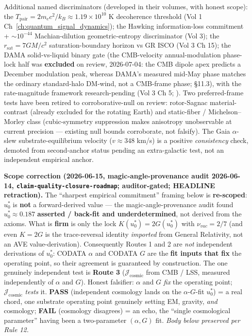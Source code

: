 \noindent Additional named discriminators (developed in their volumes, with honest scope): the $T_{\text{pair}} = 2m_ec^2/k_B \approx 1.19\times10^{10}$ K decoherence threshold (Vol 1 Ch~\ref{ch:quantum_signal_dynamics}); the Hawking information-loss commitment + $\sim 10^{-44}$ Machian-dilution geometric-entropy discriminator (Vol 3); the $r_{\text{sat}} = 7GM/c^2$ saturation-boundary horizon vs GR ISCO (Vol 3 Ch 15); the DAMA solid-vs-liquid binary gate (the CMB-velocity annual-modulation phase-lock half was \textbf{excluded} on review, 2026-07-04: the CMB dipole apex predicts a December modulation peak, whereas DAMA's measured mid-May phase matches the ordinary standard-halo DM-wind, not a CMB-frame phase;  \S11.3), with the rate-magnitude framework research-pending (Vol 3 Ch 5; ). Two preferred-frame tests have been retired to corroborative-null on review: rotor-Sagnac material-contrast (already excluded for the rotating Earth) and static-fiber / Michelson--Morley class (cubic-symmetry suppression makes anisotropy unobservable at current precision --- existing null bounds corroborate, not falsify). The Gaia $\alpha$-slew substrate-equilibrium velocity ($v \approx 348$ km/s) is a positive \emph{consistency} check, demoted from second-anchor status pending an extra-galactic test, not an independent empirical anchor.

\vspace{1.5em}
\noindent \textbf{Scope correction (2026-06-15, magic-angle-provenance audit 2026-06-14, \texttt{claim-quality-closure-roadmap}; auditor-gated; HEADLINE retraction).} The ``sharpest empirical commitment'' framing below is \textbf{re-scoped}: $u_0^*$ is \textbf{not} a forward-derived value --- the magic-angle-provenance audit found $u_0^* \approx 0.187$ \textbf{asserted / back-fit and underdetermined}, not derived from the axioms. What is \textbf{firm} is only the lock $K(u_0^*) = 2G(u_0^*)$ with $\nu_{vac} = 2/7$ (and even $K = 2G$ is the trace-reversal identity \emph{imported} from General Relativity, not an AVE value-derivation). Consequently Routes 1 and 2 are \emph{not} independent derivations of $u_0^*$: CODATA $\alpha$ and CODATA $G$ are the \textbf{fit inputs that fix} the operating point, so their agreement is guaranteed by construction. The one genuinely independent test is \textbf{Route 3} ($\mathcal{J}_{\text{cosmic}}$ from CMB / LSS, measured independently of $\alpha$ and $G$). Honest falsifier: $\alpha$ and $G$ \emph{fix} the operating point; $\mathcal{J}_{\text{cosmic}}$ \emph{tests} it. \textbf{PASS} (independent cosmology lands on the $\alpha$-$G$-fit $u_0^*$) = a real chord, one substrate operating point genuinely setting EM, gravity, \emph{and} cosmology; \textbf{FAIL} (cosmology disagrees) = an echo, the ``single cosmological parameter'' having been a two-parameter $(\alpha, G)$ fit. \textit{Body below preserved per Rule 12.}

